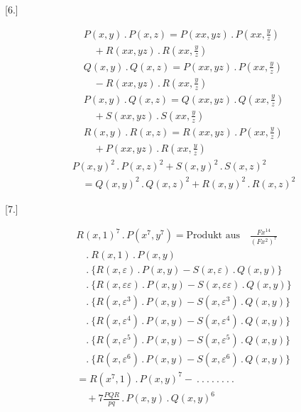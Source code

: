\par\medskip{}\centerline{[6.]}\nobreak\smallskip
\[
\begin{gathered}
P(x,y)\,.\,P(x,z)=P(xx,yz)\,.\,P(xx,\tfrac{y}{z})\\[8pt]\quad{}+R(xx,yz)\,.\,R(xx,\tfrac{y}{z})\\[8pt]
Q(x,y)\,.\,Q(x,z)=P(xx,yz)\,.\,P(xx,\tfrac{y}{z})\\[8pt]\quad{}-R(xx,yz)\,.\,R(xx,\tfrac{y}{z})\\[8pt]
P(x,y)\,.\,Q(x,z)=Q(xx,yz)\,.\,Q(xx,\tfrac{y}{z})\\[8pt]\quad{}+S(xx,yz)\,.\,S(xx,\tfrac{y}{z})\\[8pt]
R(x,y)\,.\,R(x,z)=R(xx,yz)\,.\,P(xx,\tfrac{y}{z})\\[8pt]\quad{}+P(xx,yz)\,.\,R(xx,\tfrac{y}{z})
\end{gathered}
\]
\[
\begin{gathered}P(x,y)^2\,.\,P(x,z)^2+S(x,y)^2\,.\,S(x,z)^2
\\[8pt]\quad{}=Q(x,y)^2\,.\,Q(x,z)^2+R(x,y)^2\,.\,R(x,z)^2\end{gathered}
\]


\par\medskip{}\centerline{[7.]}\nobreak\smallskip
\[
\begin{gathered}
R(x,1)^7\,.\,P(x^7,y^7)=\text{Produkt aus}\quad\frac{Fx^{14}}{(Fx^2)^7}\\[8pt]
\quad .\ R(x,1)\,.\,P(x,y)\\[8pt]
\quad .\ \{R(x,\varepsilon)\,.\,P(x,y)-S(x,\varepsilon)\,.\,Q(x,y)\}\\[8pt]
\quad .\ \{R(x,\varepsilon\varepsilon)\,.\,P(x,y)-S(x,\varepsilon\varepsilon)\,.\,Q(x,y)\}\\[8pt]
\quad .\ \{R(x,\varepsilon^3)\,.\,P(x,y)-S(x,\varepsilon^3)\,.\,Q(x,y)\}\\[8pt]
\quad .\ \{R(x,\varepsilon^4)\,.\,P(x,y)-S(x,\varepsilon^4)\,.\,Q(x,y)\}\\[8pt]
\quad .\ \{R(x,\varepsilon^5)\,.\,P(x,y)-S(x,\varepsilon^5)\,.\,Q(x,y)\}\\[8pt]
\quad .\ \{R(x,\varepsilon^6)\,.\,P(x,y)-S(x,\varepsilon^6)\,.\,Q(x,y)\}\\[8pt]
=R(x^7,1)\,.\,P(x,y)^7-\ .\ .\ .\ .\ .\ .\ .\ .\ \\[8pt]\quad{}+7\frac{PQR}{pq}\,.\,P(x,y)\,.\,Q(x,y)^6
\end{gathered}
\]

